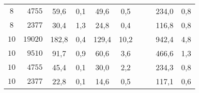 \begin{tabular}{ |c|r|S S|S S|S S|S S| }
	$8$ & $4755$ & 59,6 & 0,1 & 49,6 & 0,5 & \text{-} & \text{-} & 234,0 & 0,8  \\ 
	$8$ & $2377$ & 30,4 & 1,3 & 24,8 & 0,4 & \text{-} & \text{-} & 116,8 & 0,8  \\ 
	$10$ & $19020$ & 182,8 & 0,4 & 129,4 & 10,2 & \text{-} & \text{-} & 942,4 & 4,8  \\ 
	$10$ & $9510$ & 91,7 & 0,9 & 60,6 & 3,6 & \text{-} & \text{-} & 466,6 & 1,3  \\ 
	$10$ & $4755$ & 45,4 & 0,1 & 30,0 & 2,2 & \text{-} & \text{-} & 234,3 & 0,8  \\ 
	$10$ & $2377$ & 22,8 & 0,1 & 14,6 & 0,5 & \text{-} & \text{-} & 117,1 & 0,6  \\ 
\hline \end{tabular} 
